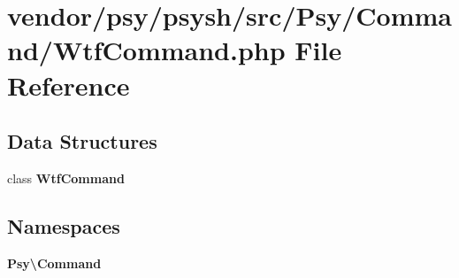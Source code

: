 \section{vendor/psy/psysh/src/\+Psy/\+Command/\+Wtf\+Command.php File Reference}
\label{_wtf_command_8php}
\subsection*{Data Structures}
\begin{DoxyCompactItemize}
\item 
class {\bf Wtf\+Command}
\end{DoxyCompactItemize}
\subsection*{Namespaces}
\begin{DoxyCompactItemize}
\item 
 {\bf Psy\textbackslash{}\+Command}
\end{DoxyCompactItemize}
